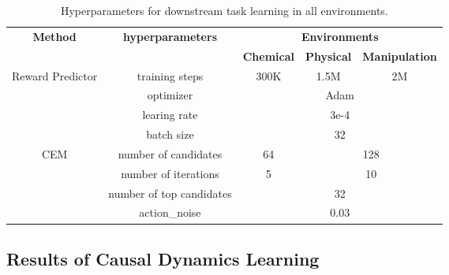 \begin{table}[h]
\caption{Hyperparameters for downstream task learning in all environments.}
\label{tab:task}
\renewcommand{\arraystretch}{1.3}
\setlength{\tabcolsep}{7pt} %
\centering
\begin{tabular}{ccccc}
\hline
\multirow{2}{*}{\textbf{Method}}           & \multirow{2}{*}{\textbf{hyperparameters}} & \multicolumn{3}{c}{\textbf{Environments}}   \\ \cline{3-5} 
                                  &                                  & \textbf{Chemical} & \textbf{Physical} & \textbf{Manipulation} \\ \hline
\multirow{4}{*}{Reward Predictor} & training steps                    & 300K     & 1.5M     & 2M           \\
                                  & optimizer                        & \multicolumn{3}{c}{Adam}           \\
                                  & learing rate                     & \multicolumn{3}{c}{3e-4}           \\
                                  & batch size                       & \multicolumn{3}{c}{32}             \\ \hline
CEM                               & number of candidates             & 64       & \multicolumn{2}{c}{128} \\
                                  & number of iterations             & 5        & \multicolumn{2}{c}{10}  \\
                                  & number of top candidates         & \multicolumn{3}{c}{32}             \\
                                  & action\_noise                    & \multicolumn{3}{c}{0.03}           \\ \hline
\end{tabular}
\end{table}

\subsection{Results of Causal Dynamics Learning}
\label{Results of causal dynamics learning}

